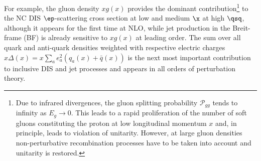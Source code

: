 For example, the gluon density $xg\left(x\right)$ provides the dominant contribution\footnote{Due to infrared divergences, the gluon splitting probability $\mathcal{P}_{gg}$ tends to infinity as $E_g \rightarrow 0$. This leads to a rapid proliferation of the number of soft gluons constituting the proton at low longitudinal momentum $x$ and, in principle, leads to violation of unitarity. However, at large gluon densities non-perturbative recombination processes have to be taken into account and unitarity is restored.} to the NC DIS $\ep$-scattering cross section at low and medium $\x$ at high $\qsq$, although it appears for the first time at NLO, while jet production in the Breit-frame (BF) is already sensitive to $xg\left(x\right)$ at leading order. The sum over all quark and anti-quark densities weighted with respective electric charges $x\Delta\left(x\right)=x\sum_{a}{e_a^2\left(q_a\left(x\right)+\bar{q}\left(x\right)\right)}$ is the next most important contribution to inclusive DIS and jet processes and appears in all orders of perturbation theory.
